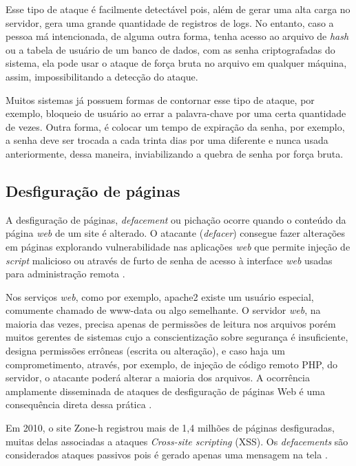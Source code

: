 \documentclass[
	12pt,				
	openright,		
	twoside,	
	a4paper,
	english,	
	brazil	
	]{abntex2}
\begin{document}
 Esse tipo de ataque é facilmente detectável pois, além de gerar uma alta carga no servidor, gera uma grande quantidade de registros de logs. No entanto, caso a pessoa má intencionada, de alguma outra forma, tenha acesso ao arquivo de \textit{hash} ou a tabela de usuário de um banco de dados, com as senha criptografadas do sistema, ela pode usar o ataque de força bruta no arquivo em qualquer máquina, assim, impossibilitando a detecção do ataque.

 Muitos sistemas já possuem formas de contornar esse tipo de ataque, por exemplo, bloqueio de usuário ao errar a palavra-chave por uma certa quantidade de vezes. Outra forma, é colocar um tempo de expiração da senha, por exemplo, a senha deve ser trocada a cada trinta dias por uma diferente e nunca usada anteriormente, dessa maneira, inviabilizando a quebra de senha por força bruta. 

 \subsection{Desfiguração de páginas} \label{sec:desfiguração}

 A desfiguração de páginas, \textit{defacement} ou pichação ocorre quando o conteúdo da página \textit{web} de um site é alterado. O atacante (\textit{defacer}) consegue fazer alterações em páginas explorando vulnerabilidade nas aplicações \textit{web} que permite injeção de \textit{script} malicioso ou através de furto de senha de acesso à interface \textit{web} usadas para administração remota \cite{certs-ataques}.

 Nos serviços \textit{web}, como por exemplo, apache2 existe um usuário especial, comumente chamado de www-data ou algo semelhante. O servidor \textit{web}, na maioria das vezes, precisa apenas de permissões de leitura nos arquivos porém muitos gerentes de sistemas cujo a conscientização sobre segurança é insuficiente, designa permissões errôneas (escrita ou alteração), e caso haja um comprometimento, através, por exemplo, de injeção de código remoto PHP, do servidor, o atacante poderá alterar a maioria dos arquivos. A ocorrência amplamente disseminada de ataques de desfiguração de páginas Web é uma consequência direta dessa prática \cite{seguranca:william-lawrie}.

 Em 2010, o site Zone-h registrou mais de 1,4 milhões de páginas desfiguradas, muitas delas associadas a ataques \textit{Cross-site scripting} (XSS). Os \textit{defacements} são considerados ataques passivos pois é gerado apenas uma mensagem na tela \cite{angelo-xss}.
\end{document}

